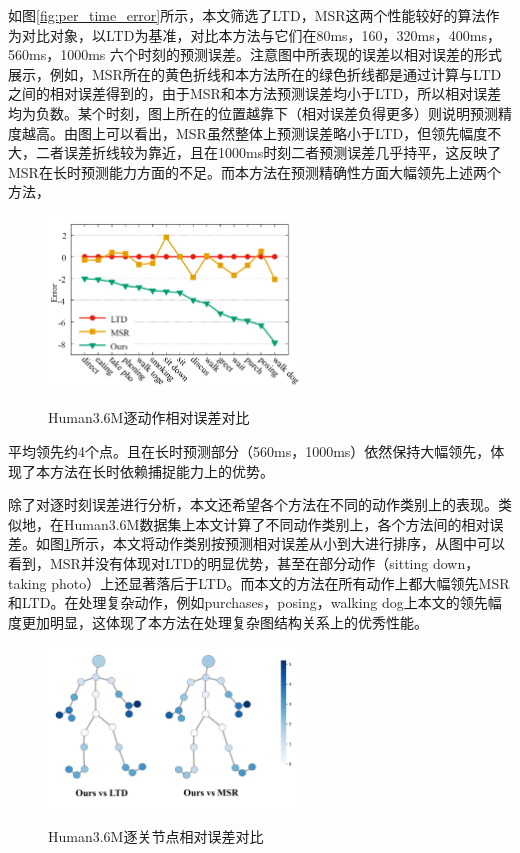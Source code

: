 如图\ref{fig:per_time_error}所示，本文筛选了LTD，MSR这两个性能较好的算法作为对比对象，以LTD为基准，对比本方法与它们在80ms，160，320ms，400ms，560ms，1000ms 六个时刻的预测误差。注意图中所表现的误差以相对误差的形式展示，例如，MSR所在的黄色折线和本方法所在的绿色折线都是通过计算与LTD之间的相对误差得到的，由于MSR和本方法预测误差均小于LTD，所以相对误差均为负数。某个时刻，图上所在的位置越靠下（相对误差负得更多）则说明预测精度越高。由图上可以看出，MSR虽然整体上预测误差略小于LTD，但领先幅度不大，二者误差折线较为靠近，且在1000ms时刻二者预测误差几乎持平，这反映了MSR在长时预测能力方面的不足。而本方法在预测精确性方面大幅领先上述两个方法，
\begin{figure}[h]
    \centering
    \includegraphics[width=0.60\textwidth]{FigMa/per_action.png}\\
    \vspace{-0.3cm}
    \caption{Human3.6M逐动作相对误差对比}
    \label{fig:per_action_error}
\end{figure}
平均领先约4个点。且在长时预测部分（560ms，1000ms）依然保持大幅领先，体现了本方法在长时依赖捕捉能力上的优势。


除了对逐时刻误差进行分析，本文还希望各个方法在不同的动作类别上的表现。类似地，在Human3.6M数据集上本文计算了不同动作类别上，各个方法间的相对误差。如图\ref{fig:per_action_error}所示，本文将动作类别按预测相对误差从小到大进行排序，从图中可以看到，MSR并没有体现对LTD的明显优势，甚至在部分动作（sitting down，taking photo）上还显著落后于LTD。而本文的方法在所有动作上都大幅领先MSR和LTD。在处理复杂动作，例如purchases，posing，walking dog上本文的领先幅度更加明显，这体现了本方法在处理复杂图结构关系上的优秀性能。

\begin{figure}[ht]
    \centering
    \includegraphics[width=0.60\textwidth]{FigMa/per_joint.png}\\
    \vspace{-0.3cm}
    \caption{Human3.6M逐关节点相对误差对比}
    \label{fig:per_joint_error}
\end{figure}

